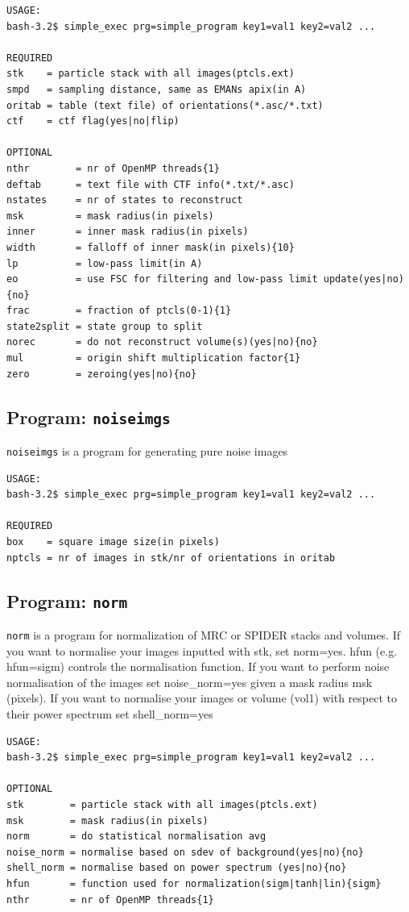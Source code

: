 \documentclass[a4paper,11pt]{article}
\newcommand{\prgname}[1]{\textcolor{NavyBlue}{\texttt{#1}}}
\begin{document}
\begin{verbatim}
USAGE:
bash-3.2$ simple_exec prg=simple_program key1=val1 key2=val2 ...

REQUIRED
stk    = particle stack with all images(ptcls.ext)
smpd   = sampling distance, same as EMANs apix(in A)
oritab = table (text file) of orientations(*.asc/*.txt)
ctf    = ctf flag(yes|no|flip)

OPTIONAL
nthr        = nr of OpenMP threads{1}
deftab      = text file with CTF info(*.txt/*.asc)
nstates     = nr of states to reconstruct
msk         = mask radius(in pixels)
inner       = inner mask radius(in pixels)
width       = falloff of inner mask(in pixels){10}
lp          = low-pass limit(in A)
eo          = use FSC for filtering and low-pass limit update(yes|no){no}
frac        = fraction of ptcls(0-1){1}
state2split = state group to split
norec       = do not reconstruct volume(s)(yes|no){no}
mul         = origin shift multiplication factor{1}
zero        = zeroing(yes|no){no}
\end{verbatim}

\subsection{Program: \prgname{noiseimgs}}
\label{noiseimgs}
\prgname{noiseimgs} is a program for generating pure noise images

\begin{verbatim}
USAGE:
bash-3.2$ simple_exec prg=simple_program key1=val1 key2=val2 ...

REQUIRED
box    = square image size(in pixels)
nptcls = nr of images in stk/nr of orientations in oritab
\end{verbatim}

\subsection{Program: \prgname{norm}}
\label{norm}
\prgname{norm} is a program for normalization of MRC or SPIDER stacks and volumes. If you want to normalise your images inputted with stk, set norm=yes. hfun (e.g. hfun=sigm) controls the normalisation function. If you want to perform noise normalisation of the images set noise\_norm=yes given a mask radius msk (pixels). If you want to normalise your images or volume (vol1) with respect to their power spectrum set shell\_norm=yes 

\begin{verbatim}
USAGE:
bash-3.2$ simple_exec prg=simple_program key1=val1 key2=val2 ...

OPTIONAL
stk        = particle stack with all images(ptcls.ext)
msk        = mask radius(in pixels)
norm       = do statistical normalisation avg
noise_norm = normalise based on sdev of background(yes|no){no}
shell_norm = normalise based on power spectrum (yes|no){no}
hfun       = function used for normalization(sigm|tanh|lin){sigm}
nthr       = nr of OpenMP threads{1}
\end{verbatim}
\end{document}
